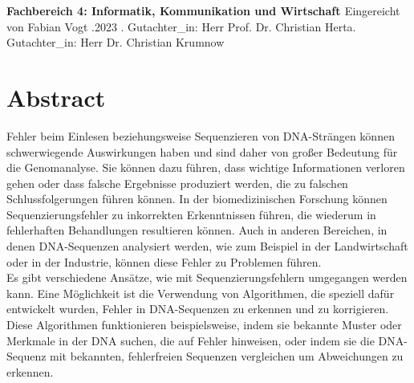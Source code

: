 \documentclass[oneside,bibliography=totocnumbered,BCOR=5mm]{scrbook}%
\theoremstyle{definition}
\theoremstyle{definition}
\theoremstyle{definition}
\theoremstyle{definition}
\theoremstyle{definition}
\theoremstyle{definition}
\begin{document}
\begin{titlepage}
\begin{center}
\linebreak[4]
\textbf{\large{\color{HTW_green} Fachbereich 4: Informatik, Kommunikation und Wirtschaft }}
\linebreak[4]
\linebreak[4]
\linebreak[4]
\linebreak[4]
Eingereicht von Fabian Vogt
\linebreak[4]
.2023
\linebreak[4]
\linebreak[4]
\linebreak[4]
. Gutachter\_in: Herr Prof. Dr. Christian Herta. Gutachter\_in: Herr Dr. Christian Krumnow\linebreak[4]
\linebreak[4]

\end{center}
\end{titlepage}
\newpage    

\thispagestyle{empty}    

\section*{Abstract}
Fehler beim Einlesen beziehungsweise Sequenzieren von DNA-Strängen können schwerwiegende Auswirkungen haben und sind daher von großer Bedeutung für die Genomanalyse. 
Sie können dazu führen, dass wichtige Informationen verloren gehen oder dass falsche Ergebnisse produziert werden, die zu falschen Schlussfolgerungen führen können. 
In der biomedizinischen Forschung können Sequenzierungsfehler zu inkorrekten Erkenntnissen führen, die wiederum in fehlerhaften Behandlungen resultieren können. 
Auch in anderen Bereichen, in denen DNA-Sequenzen analysiert werden, wie zum Beispiel in der Landwirtschaft oder in der Industrie, 
können diese Fehler zu Problemen führen.\\

Es gibt verschiedene Ansätze, wie mit Sequenzierungsfehlern umgegangen werden kann.
Eine Möglichkeit ist die Verwendung von Algorithmen, die speziell dafür entwickelt wurden, 
Fehler in DNA-Sequenzen zu erkennen und zu korrigieren. 
Diese Algorithmen funktionieren beispielsweise, indem sie bekannte Muster oder Merkmale in der DNA suchen, 
die auf Fehler hinweisen, oder indem sie die DNA-Sequenz mit bekannten, 
fehlerfreien Sequenzen vergleichen um Abweichungen zu erkennen.\\ 
\end{document}
